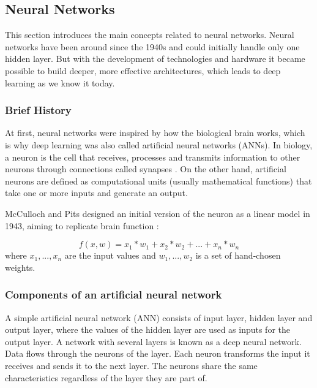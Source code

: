 \subsection{Neural Networks}
This section introduces the main concepts related to neural networks. Neural networks have been around since the 1940s and could initially handle only one hidden layer. But with the development of technologies and hardware it became possible to build deeper, more effective architectures, which leads to deep learning as we know it today. \par



\subsubsection{Brief History}


At first, neural networks were inspired by how the biological brain works, which is why deep learning was also called artificial neural networks (ANNs)\cite{Goodfellow-et-al-2016}. In biology, a neuron is the cell that receives, processes and transmits information to other neurons through connections called synapses \cite{neuron}. On the other hand, artificial neurons are defined as computational units (usually mathematical functions) that take one or more inputs and generate an output. \par

McCulloch and Pits designed an initial version of the neuron as a linear model in 1943, aiming to replicate brain function \cite{REF:11}:


\begin{equation}
f(x,w)=x_1*w_1 +x_2*w_2 +...+x_n*w_n
\end{equation}
where $x_1, ..., x_n$ are the input values and $w_1, ..., w_2$ is a set of hand-chosen weights.

\subsubsection{Components of an artificial neural network}

A simple artificial neural network (ANN) consists of input layer, hidden layer and output layer, where the values of the hidden layer are used as inputs for the output layer. A network with several layers is known as a deep neural network. Data flows through the neurons of the layer. Each neuron transforms the input it receives and sends it to the next layer. The neurons share the same characteristics regardless of the layer they are part of. \par



